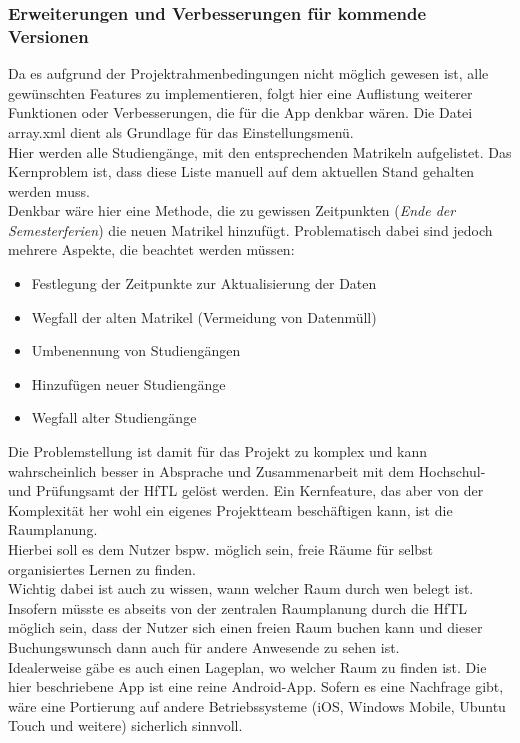 \begin{description}
\subsubsection{Erweiterungen und Verbesserungen für kommende Versionen}
Da es aufgrund der Projektrahmenbedingungen nicht möglich gewesen ist, alle gewünschten Features zu implementieren, folgt hier eine Auflistung weiterer Funktionen oder Verbesserungen, die für die App denkbar wären.
\label{pflege}
Die Datei array.xml dient als Grundlage für das Einstellungsmenü.\\
Hier werden alle Studiengänge, mit den entsprechenden Matrikeln aufgelistet. Das Kernproblem ist, dass diese Liste manuell auf dem aktuellen Stand gehalten werden muss.\\
Denkbar wäre hier eine Methode, die zu gewissen Zeitpunkten (\textit{Ende der Semesterferien}) die neuen Matrikel hinzufügt. Problematisch dabei sind jedoch mehrere Aspekte, die beachtet werden müssen:
\begin{itemize}
\item Festlegung der Zeitpunkte zur Aktualisierung der Daten
\item Wegfall der alten Matrikel (Vermeidung von Datenmüll)
\item Umbenennung von Studiengängen
\item Hinzufügen neuer Studiengänge
\item Wegfall alter Studiengänge
\end{itemize}
Die Problemstellung ist damit für das Projekt zu komplex und kann wahrscheinlich besser in Absprache und Zusammenarbeit mit dem Hochschul- und Prüfungsamt der HfTL  gelöst werden.
Ein Kernfeature, das aber von der Komplexität her wohl ein eigenes Projektteam beschäftigen kann, ist die Raumplanung.\\
Hierbei soll es dem Nutzer bspw. möglich sein, freie Räume für selbst organisiertes Lernen zu finden.\\ Wichtig dabei ist auch zu wissen, wann welcher Raum durch wen belegt ist. Insofern müsste es abseits von der zentralen Raumplanung durch die HfTL möglich sein, dass der Nutzer sich einen freien Raum buchen kann und dieser Buchungswunsch dann auch für andere Anwesende zu sehen ist.\\
Idealerweise gäbe es auch einen Lageplan, wo welcher Raum zu finden ist.
Die hier beschriebene App ist eine reine Android-App. Sofern es eine Nachfrage gibt, wäre eine Portierung auf andere Betriebssysteme (iOS, Windows Mobile, Ubuntu Touch und weitere) sicherlich sinnvoll.


\end{description}
